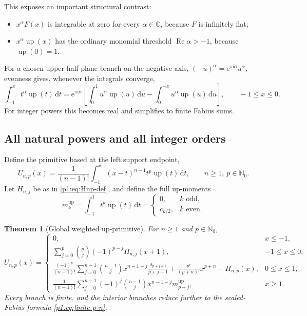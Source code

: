 \documentclass[11pt,oneside]{article}
\newtheorem{theorem}{Theorem}[section]
\theoremstyle{definition}
\theoremstyle{remark}
\newcommand{\Up}{\operatorname{up}}
\newcommand{\C}{\mathbb C}
\newcommand{\N}{\mathbb N}
\newcommand{\dd}{\,\mathrm d}
\newcommand{\e}{\mathrm e}
\newcommand{\ii}{\mathrm i}
\newcommand{\1}{\mathbf 1}
\DeclareMathOperator{\Rea}{Re}
\begin{document}
This exposes an important structural contrast:
\begin{itemize}
\item \(x^\alpha F(x)\) is integrable at zero for every
      \(\alpha\in\C\), because \(F\) is infinitely flat;
\item \(x^\alpha\Up(x)\) has the ordinary monomial threshold
      \(\Rea\alpha>-1\), because \(\Up(0)=1\).
\end{itemize}
For a chosen upper-half-plane branch on the negative axis,
\((-u)^\alpha=\e^{\pi\ii\alpha}u^\alpha\), evenness gives, whenever the
integrals converge,
\begin{equation}
 \int_{-1}^xt^\alpha\Up(t)\dd t
 =\e^{\pi\ii\alpha}
 \left[
 \int_0^1u^\alpha\Up(u)\dd u-
 \int_0^{-x}u^\alpha\Up(u)\dd u
 \right],\qquad -1\leq x\leq0.                                \label{p1:eq:up-negative-alpha}
\end{equation}
For integer powers this becomes real and simplifies to finite Fabius sums.

\subsection{All natural powers and all integer orders}
Define the primitive based at the left support endpoint,
\begin{equation}
 U_{n,p}(x)=\frac1{(n-1)!}\int_{-1}^x(x-t)^{n-1}t^p\Up(t)\dd t,
 \qquad n\geq1,\ p\in\N_0.                                    \label{p1:eq:Unp-def}
\end{equation}
Let \(H_{n,j}\) be as in \eqref{p1:eq:Hnp-def}, and define the full up-moments
\begin{equation}
 m_k^{\Up}=\int_{-1}^1t^k\Up(t)\dd t
 =\begin{cases}0,&k\text{ odd},\\ c_{k/2},&k\text{ even}.
 \end{cases}                                                    \label{p1:eq:up-full-moment}
\end{equation}

\begin{theorem}[Global weighted up-primitive]\label{p1:thm:up-global}
For \(n\geq1\) and \(p\in\N_0\),
\begin{equation}
 U_{n,p}(x)=
 \begin{cases}
 0,&x\leq-1,\\[1mm]
 \displaystyle
 \sum_{j=0}^p\binom pj(-1)^{p-j}H_{n,j}(x+1),
 &-1\leq x\leq0,\\[4mm]
 \displaystyle
 \frac{(-1)^p}{(n-1)!}
 \sum_{j=0}^{n-1}\binom{n-1}{j}
 x^{n-1-j}\frac{d_{p+j+1}}{p+j+1}
 +\frac{p!}{(p+n)!}x^{p+n}-H_{n,p}(x),
 &0\leq x\leq1,\\[5mm]
 \displaystyle
 \frac1{(n-1)!}\sum_{j=0}^{n-1}(-1)^j\binom{n-1}{j}
 x^{n-1-j}m_{p+j}^{\Up},
 &x\geq1.
 \end{cases}                                                    \label{p1:eq:up-global}
\end{equation}
Every branch is finite, and the interior branches reduce further to the
scaled-Fabius formula \eqref{p1:eq:finite-p-n}.
\end{theorem}
\end{document}
